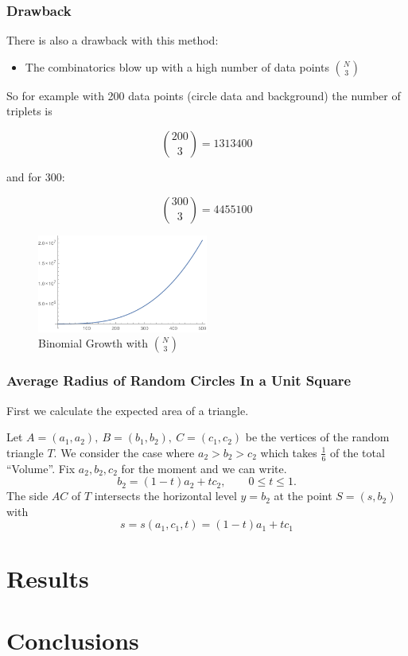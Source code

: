 \documentclass[10pt,twoside]{scrreprt}
\begin{document}
\subsection{Drawback}
	

There is also a drawback with this method:

\begin{itemize}
\item The combinatorics blow up with a high number of data points \( \binom{N}{3} \)
\end{itemize}

So for example with 200 data points (circle data and background) the number of triplets is

\[ \binom{200}{3} = 1313400 \]

and for 300:

\[ \binom{300}{3} = 4455100 \]


\begin{figure}[tb]
  \centering
  \includegraphics[width=0.5\textwidth]{pics/binomial_growth}
  \caption{Binomial Growth with $\binom{N}{3}$}
  \label{fig:figure1}
\end{figure}


\subsection{Average Radius of Random Circles In a Unit Square} %
\label{ssub:average_radius_of_random_circles_in_a_unit_square}

First we calculate the expected area of a triangle.

Let \( A = (a_1, a_2),\ B = (b_1, b_2),\ C = (c_1, c_2)\) be the vertices of the random triangle \( T \). We consider the case where \( a_2
> b_2 > c_2 \) which takes $\frac{1}{6}$ of the total ``Volume''. Fix \( a_2, b_2, c_2 \) for the moment and we can write.
\[
  b_2 = (1-t)a_2 + tc_2, \qquad 0 \leq t \leq 1.
\]
The side $AC$ of $T$ intersects the horizontal level $y=b_2$ at the point $S=(s,b_2)$ with
\begin{equation}
  s = s(a_1,c_1,t) = (1-t)a_1 + tc_1
\end{equation}
\chapter{Results}


\chapter{Conclusions} %
\label{cha:conclusions}


\printbibliography
\end{document}

